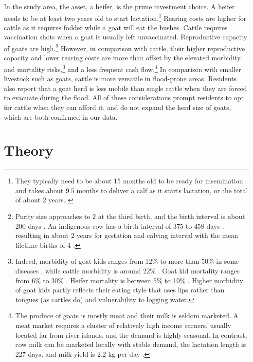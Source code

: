 	In the study area, the asset, a heifer, is the prime investment choice. A heifer needs to be at least two years old to start lactation.\footnote{They typically need to be about 15 months old to be ready for insemination and takes about 9.5 months to deliver a calf as it starts lactation, or the total of about 2 years. \label{heifer2years}} Rearing costs are higher for cattle as it requires fodder while a goat will eat the bushes. Cattle requires vaccination shots when a goat is usually left unvaccinated. Reproductive capacity of goats are high.\footnote{Parity size approaches to 2 at the third birth, and the birth interval is about 200 days \citep{Hasan2014goat}. An indigenous cow has a birth interval of 375 to 458 days \citep{Hasan2018}, resulting in about 2 years for gestation and calving interval \citep{Habib2012} with the mean lifetime births of 4 \citep[][Table 1]{Hasan2018}. } However, in comparison with cattle, their higher reproductive capacity and lower rearing costs are more than offset by the elevated morbidity and mortality risks,\footnote{Indeed, morbidity of goat kids ranges from 12\% \citep{Mahmud2015} to more than 50\% in some diseases \citep[][Table 5]{Nandi2011}, while cattle morbidity is around 22\% \citep{Bangar2013}. Goat kid mortality ranges from 6\% \citep{Mahmud2015} to 30\% \citep[][Table 5]{Paul2014} \citep{Ershaduzzaman2007}. Heifer mortality is between 5\% \citep[][p.332R]{Hossain2014} to 10\% \citep{Alauddin2018}. Higher morbidity of goat kids partly reflects their eating style that uses lips rather than tongues (as cattles do) and vulnerability to logging water. } and a less frequent cash flow.\footnote{The produce of goats is mostly meat and their milk is seldom marketed. A meat market requires a cluster of relatively high income earners, usually located far from river islands, and the demand is highly seasonal. In contrast, cow milk can be marketed locally with stable demand, the lactation length is 227 days, and milk yield is 2.2 kg per day \citep{Rokonuzzaman2009}. } In comparison with smaller livestock such as goats, cattle is more versatile in flood-prone areas. Residents also report that a goat herd is less mobile than single cattle when they are forced to evacuate during the flood. All of these considerations prompt residents to opt for cattle when they can afford it, and do not expand the herd size of goats, which are both confirmed in our data.

\section{Theory}
\label{SecTheory}

